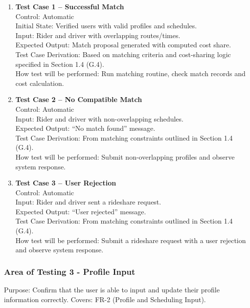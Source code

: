 \documentclass[12pt, titlepage]{article}
\begin{document}
\begin{enumerate}
\item \textbf{Test Case 1 – Successful Match}\\
Control: Automatic\\
Initial State: Verified users with valid profiles and schedules.\\
Input: Rider and driver with overlapping routes/times.\\
Expected Output: Match proposal generated with computed cost share.\\
Test Case Derivation: Based on matching criteria and cost-sharing logic specified in Section 1.4 (G.4).\\
How test will be performed: Run matching routine, check match records and cost calculation.\\[5pt]

\item \textbf{Test Case 2 – No Compatible Match}\\
Control: Automatic\\
Input: Rider and driver with non-overlapping schedules.\\
Expected Output: “No match found” message.\\
Test Case Derivation: From matching constraints outlined in Section 1.4 (G.4).\\
How test will be performed: Submit non-overlapping profiles and observe system response.\\

\item \textbf{Test Case 3 – User Rejection}\\
Control: Automatic\\
Input: Rider and driver sent a rideshare request.\\
Expected Output: “User rejected” message.\\
Test Case Derivation: From matching constraints outlined in Section 1.4 (G.4).\\
How test will be performed: Submit a rideshare request with a user rejection and observe system response.\\

\end{enumerate}

\subsubsection{Area of Testing 3 - Profile Input}

Purpose: Confirm that the user is able to input and update their profile information correctly.  
Covers: FR-2 (Profile and Scheduling Input).
\end{document}
